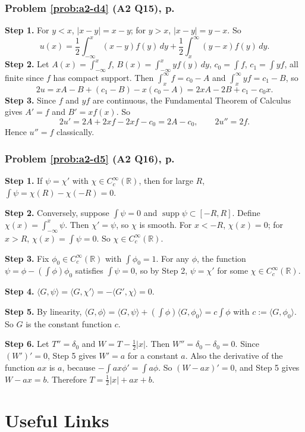 \documentclass{article}
\newcommand{\R}{\mathbb{R}}
\newcommand{\D}{C_c^\infty(\R)}
\newcommand{\ip}[2]{\langle #1, #2 \rangle}
\begin{document}
\label{sol:a2-d4}
\subsubsection*{Problem \ref{prob:a2-d4} (A2 Q15), p.~\pageref{prob:a2-d4}}
\textbf{Step 1.} For $y < x$, $|x - y| = x - y$; for $y > x$, $|x - y| = y - x$. So
\begin{equation*}
    u(x) = \frac12\int_{-\infty}^x(x - y)f(y)\,dy + \frac12\int_x^\infty(y - x)f(y)\,dy.
\end{equation*}
\textbf{Step 2.} Let $A(x) = \int_{-\infty}^xf$, $B(x) = \int_{-\infty}^xyf(y)\,dy$, $c_0 = \int f$, $c_1 = \int yf$, all finite since $f$ has compact support. Then $\int_x^\infty f = c_0 - A$ and $\int_x^\infty yf = c_1 - B$, so
\begin{equation*}
    2u = xA - B + (c_1 - B) - x(c_0 - A) = 2xA - 2B + c_1 - c_0x.
\end{equation*}
\textbf{Step 3.} Since $f$ and $yf$ are continuous, the Fundamental Theorem of Calculus gives $A' = f$ and $B' = xf(x)$. So
\begin{equation*}
    2u' = 2A + 2xf - 2xf - c_0 = 2A - c_0, \qquad 2u'' = 2f.
\end{equation*}
Hence $u'' = f$ classically.

\label{sol:a2-d5}
\subsubsection*{Problem \ref{prob:a2-d5} (A2 Q16), p.~\pageref{prob:a2-d5}}
\textbf{Step 1.} If $\psi = \chi'$ with $\chi \in \D$, then for large $R$, $\int\psi = \chi(R) - \chi(-R) = 0$.\par
\textbf{Step 2.} Conversely, suppose $\int\psi = 0$ and $\operatorname{supp}\psi \subset [-R,R]$. Define $\chi(x) = \int_{-\infty}^x\psi$. Then $\chi' = \psi$, so $\chi$ is smooth. For $x < -R$, $\chi(x) = 0$; for $x > R$, $\chi(x) = \int\psi = 0$. So $\chi \in \D$.\par
\textbf{Step 3.} Fix $\phi_0 \in \D$ with $\int\phi_0 = 1$. For any $\phi$, the function $\psi = \phi - (\int\phi)\phi_0$ satisfies $\int\psi = 0$, so by Step 2, $\psi = \chi'$ for some $\chi \in \D$.\par
\textbf{Step 4.} $\ip{G}{\psi} = \ip{G}{\chi'} = -\ip{G'}{\chi} = 0$.\par
\textbf{Step 5.} By linearity, $\ip{G}{\phi} = \ip{G}{\psi} + (\int\phi)\ip{G}{\phi_0} = c\int\phi$ with $c := \ip{G}{\phi_0}$. So $G$ is the constant function $c$.\par
\textbf{Step 6.} Let $T'' = \delta_0$ and $W = T - \frac12|x|$. Then $W'' = \delta_0 - \delta_0 = 0$. Since $(W')' = 0$, Step 5 gives $W' = a$ for a constant $a$. Also the derivative of the function $ax$ is $a$, because $-\int ax\phi' = \int a\phi$. So $(W - ax)' = 0$, and Step 5 gives $W - ax = b$. Therefore $T = \frac12|x| + ax + b$.



\section{Useful Links}
\end{document}
